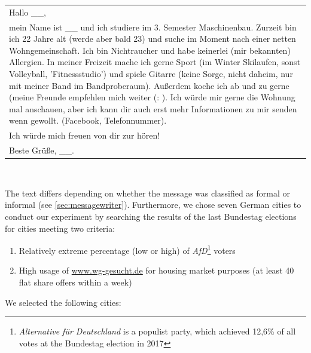 \documentclass[11pt]{scrartcl}
\begin{document}
\footnotesize\raggedleft
\begin{tabular}{|p{}}
Hallo \_\_,\\ mein Name ist \_\_ und ich studiere im 3. Semester Maschinenbau. Zurzeit bin ich 22 Jahre alt (werde aber bald 23) und suche im Moment nach einer netten Wohngemeinschaft. Ich bin Nichtraucher und habe keinerlei (mir bekannten) Allergien. In meiner Freizeit mache ich gerne Sport (im Winter Skilaufen, sonst Volleyball, 'Fitnessstudio') und spiele Gitarre (keine Sorge, nicht daheim, nur mit meiner Band im Bandproberaum). Außerdem koche ich ab und zu gerne (meine Freunde empfehlen mich weiter (: ). Ich würde mir gerne die Wohnung mal anschauen, aber ich kann dir auch erst mehr Informationen zu mir senden wenn gewollt. (Facebook, Telefonnummer). \\ Ich würde mich freuen von dir zur hören! \\ Beste Grüße, \_\_.\\
\end{tabular}\\
\normalsize
\bigskip
\raggedright
The text differs depending on whether the message was classified as formal or informal (see \ref{sec:messagewriter}).
\newpage
Furthermore, we chose seven German cities to conduct our experiment by searching the results of the last Bundestag elections \cite{Bun:1} for cities meeting two criteria:

\begin{enumerate}
    \item Relatively extreme percentage (low or high) of \textit{AfD}\footnote{\textit{Alternative für Deutschland} is a populist party, which achieved 12,6\% of all votes at the Bundestag election in 2017} voters
    \item High usage of \url{www.wg-gesucht.de} for housing market purposes (at least 40 flat share offers within a week)
\end{enumerate}

We selected the following cities:
\end{document}
